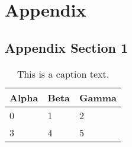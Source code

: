%
\chapter{Appendix}
\label{sec:appendix}


\section{Appendix Section 1}
\label{sec:appendix:sec1}

\begin{table}[h]
	\begin{tabularx}{\textwidth}{X | X | X}
		Alpha		& Beta			& Gamma			\\ \hline
		0			& 1				& 2				\\ \hline
		3			& 4				& 5				\\ %
	\end{tabularx}
	\label{tab:table1}
	\caption{This is a caption text.}
\end{table}
